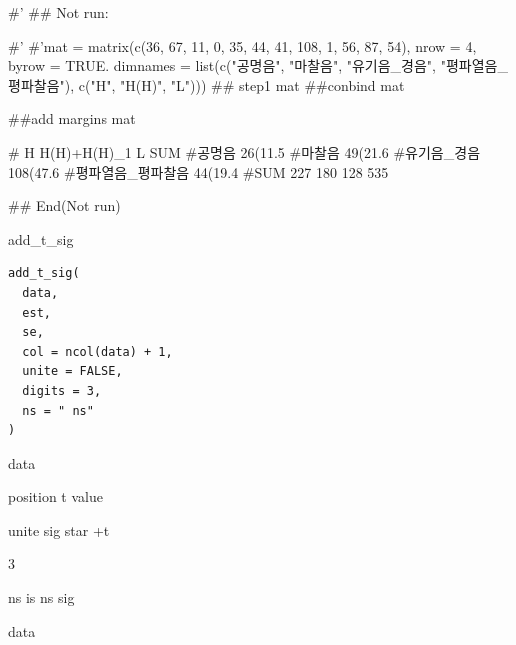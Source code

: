 \documentclass[a4paper]{book}
\begin{document}
\begin{Examples}
\begin{ExampleCode}

#'
\#\# Not run: 

#' #'mat = matrix(c(36, 67, 11,
          0, 35, 44,
         41, 108, 1,
          56, 87, 54),
           nrow = 4, byrow = TRUE.
   dimnames = list(c("공명음", "마찰음",
     "유기음_경음", "평파열음_평파찰음"),  c("H", "H(H)", "L")))
## step1
  mat %
##conbind
 mat %

##add margins
 mat %

 #                           H H(H)+H(H)_1         L SUM
 #공명음             26(11.5%
 #마찰음             49(21.6%
 #유기음_경음       108(47.6%
 #평파열음_평파찰음  44(19.4%
 #SUM                      227         180       128 535







## End(Not run)

\end{ExampleCode}
\end{Examples}
%
\begin{Description}
add\_t\_sig
\end{Description}
%
\begin{Usage}
\begin{verbatim}
add_t_sig(
  data,
  est,
  se,
  col = ncol(data) + 1,
  unite = FALSE,
  digits = 3,
  ns = " ns"
)
\end{verbatim}
\end{Usage}
%
\begin{Arguments}
\begin{ldescription}
\item[\code{data}] data

\item[\code{col}] position t value

\item[\code{unite}] unite sig star +t

\item[\code{digits}] 3

\item[\code{ns}] ns is ns sig
\end{ldescription}
\end{Arguments}
%
\begin{Value}
data
\end{Value}
\end{document}
